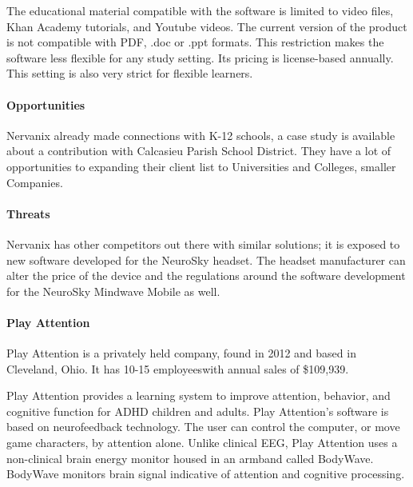 \documentclass[letterpaper,10pt]{article}
\begin{document}
The educational material compatible with the software is limited to video files, Khan Academy tutorials, and Youtube videos. The current version of the product is not compatible with PDF, .doc or .ppt formats. This restriction makes the software less flexible for any study setting. Its pricing is license-based annually. This setting is also very strict for flexible learners.

\paragraph{Opportunities}

Nervanix already made connections with K-12 schools, a case study is available about a contribution with Calcasieu Parish School District. They have a lot of opportunities to expanding their client list to Universities and Colleges, smaller Companies.

\paragraph{Threats}

Nervanix has other competitors out there with similar solutions; it is exposed to new software developed for the NeuroSky headset. The headset manufacturer can alter the price of the device and the regulations around the software development for the NeuroSky Mindwave Mobile as well.

\paragraph{Play Attention}

Play Attention is a privately held company, found in 2012 and based in Cleveland, Ohio. It has 10-15 employeeswith annual sales of \$109,939.

Play Attention provides a learning system to improve attention, behavior, and cognitive function for ADHD children and adults. Play Attention’s software is based on neurofeedback technology. The user can control the computer, or move game characters, by attention alone. 
Unlike clinical EEG, Play Attention uses a non-clinical brain energy monitor housed in an armband called BodyWave. BodyWave monitors brain signal indicative of attention and cognitive processing. 
 
\end{document}
